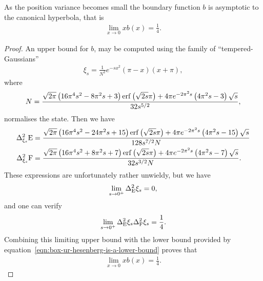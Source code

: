 \begin{lem}\label{lem:box-ur-b-asymptotic-to-hyperbola}
  As the position variance becomes small the boundary function $b$ is asymptotic to the canonical hyperbola, that is
  \begin{align}
    \lim_{x\to 0} x b(x) = \frac{1}{4}.
  \end{align}
\end{lem}
\begin{proof}
An upper bound for $b$, may be computed using the family of ``tempered-Gaussians''
\begin{align}
  \xi_s = \frac{1}{N^2} e^{-s x^2} (\pi-x)(x+\pi),
\end{align}
where
\begin{align}
  N = \frac{\sqrt{2 \pi } \left(16 \pi^4 s^2-8 \pi^2 s+3\right) \operatorname{erf}\left(\sqrt{2s} \pi \right)+4 \pi  e^{-2 \pi ^2 s} \left(4 \pi ^2 s-3\right) \sqrt{s}}{32 s^{5/2}},
\end{align}
normalises the state. Then we have
\begin{align}
  \var[\xi_s]{\ope} &= \frac{\sqrt{2 \pi } \left(16 \pi ^4 s^2-24 \pi ^2 s+15\right) \erf\left(\sqrt{2s} \pi\right)+4 \pi  e^{-2 \pi ^2 s} \left(4 \pi ^2 s-15\right) \sqrt{s}}{128 s^{7/2}N}\\
  \var[\xi_s]{\opf} &= \frac{\sqrt{2 \pi } \left(16 \pi ^4 s^2+8 \pi ^2 s+7\right) \erf\left(\sqrt{2s} \pi\right)+4 \pi  e^{-2 \pi ^2 s} \left(4 \pi ^2 s-7\right) \sqrt{s}}{32 s^{3/2}N }.
\end{align}
These expressions are unfortunately rather unwieldy, but we have
\begin{align}
  \lim_{s\to 0^+} \var[\ope]{\xi_s} = 0,
\end{align}
and one can verify
\begin{align}
  \lim_{s\to 0^+} \var[\ope]{\xi_s}\var[\opf]{\xi_s} = \frac{1}{4}.
\end{align}
Combining this limiting upper bound with the lower bound provided by equation~\eqref{eqn:box-ur-hesenberg-is-a-lower-bound} proves that
\begin{align}
  \lim_{x\to 0} x b(x) = \frac{1}{4}.
\end{align}
\end{proof}

